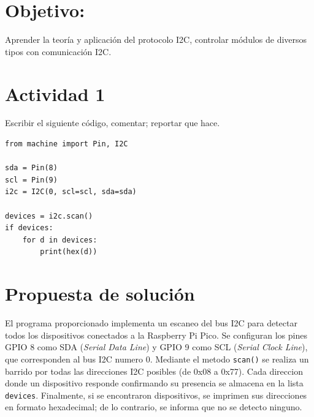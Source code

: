 \documentclass[letterpaper,12pt]{article}
\begin{document}
    

    \newpage
    \setcounter{page}{1}

    \section{Objetivo:}

    Aprender la teoría y aplicación del protocolo I2C, controlar módulos de diversos tipos con comunicación I2C.

    \section*{Actividad 1}

\noindent Escribir el siguiente código, comentar; reportar que hace.

\begin{lstlisting}[basicstyle=\ttfamily\footnotesize, caption={Figura 10-9. Código de prueba; actividad 1}]
from machine import Pin, I2C

sda = Pin(8)
scl = Pin(9)
i2c = I2C(0, scl=scl, sda=sda)

devices = i2c.scan()
if devices:
    for d in devices:
        print(hex(d))
\end{lstlisting}

\section*{Propuesta de solución}

El programa proporcionado implementa un escaneo del bus I2C para detectar todos los dispositivos conectados a la Raspberry Pi Pico. Se configuran los pines GPIO 8 como SDA (\textit{Serial Data Line}) y GPIO 9 como SCL (\textit{Serial Clock Line}), que corresponden al bus I2C numero 0. Mediante el metodo \texttt{scan()} se realiza un barrido por todas las direcciones I2C posibles (de 0x08 a 0x77). Cada direccion donde un dispositivo responde confirmando su presencia se almacena en la lista \texttt{devices}. Finalmente, si se encontraron dispositivos, se imprimen sus direcciones en formato hexadecimal; de lo contrario, se informa que no se detecto ninguno.
\end{document}
